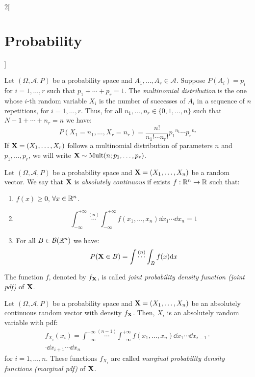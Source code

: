 \documentclass[../../../main.tex]{subfiles}
\begin{document}
\begin{multicols}{2}[\section{Probability}]
  \begin{definition}
    Let $(\Omega,\mathcal{A},P)$ be a probability space and $A_1,\ldots,A_r\in\mathcal{A}$. Suppose $P(A_i)=p_i$ for $i=1,\ldots,r$ such that $p_1+\cdots+p_r=1$. The \textit{multinomial distribution} is the one whose $i$-th random variable $X_i$ is the number of successes of $A_i$ in a sequence of $n$ repetitions, for $i=1,\ldots,r$. Thus, for all $n_1,\ldots,n_r\in\{0,1,\ldots,n\}$ such that $N-1+\cdots+n_r=n$ we have: $$P(X_1=n_1,\ldots,X_r=n_r)=\frac{n!}{n_1!\cdots n_r!} {p_1}^{n_1}\cdots{p_r}^{n_r}$$ If $\boldsymbol{\mathrm{X}}=(X_1,\ldots,X_r)$ follows a multinomial distribution of parameters $n$ and $p_1,\ldots,p_r$, we will write $\boldsymbol{\mathrm{X}}\sim \text{Mult}(n;p_1,\ldots,p_r)$.
  \end{definition}
  \begin{definition}
    Let $(\Omega,\mathcal{A},P)$ be a probability space and $\boldsymbol{\mathrm{X}}=(X_1,\ldots,X_n)$ be a random vector. We say that $\boldsymbol{\mathrm{X}}$ is \textit{absolutely continuous} if exists $f:\mathbb{R}^n\rightarrow\mathbb{R}$ such that:
    \begin{enumerate}
      \item $f(x)\geq 0$, $\forall x\in\mathbb{R}^n$.
      \item \hfill $$\int_{-\infty}^{+\infty}\overset{(n)}{\cdots}\int_{-\infty}^{+\infty} f(x_1,\ldots,x_n)\dd x_1\cdots\dd x_n=1$$
      \item For all $B\in\mathcal{B}(\mathbb{R}^n)$ we have: $$P(\boldsymbol{\mathrm{X}}\in B)=\int\overset{(n)}{\cdots}\int_Bf(x)\dd x$$
    \end{enumerate}
    The function $f$, denoted by $f_{\boldsymbol{\mathrm{X}}}$, is called \textit{joint probability density function (joint pdf)} of $\boldsymbol{\mathrm{X}}$.
  \end{definition}
  \begin{prop}
    Let $(\Omega,\mathcal{A},P)$ be a probability space and $\boldsymbol{\mathrm{X}}=(X_1,\ldots,X_n)$ be an absolutely continuous random vector with density $f_{\boldsymbol{\mathrm{X}}}$. Then, $X_i$ is an absolutely random variable with pdf:
    \begin{multline*}
      f_{X_i}(x_i)=\int_{-\infty}^{+\infty}\overset{(n-1)}{\cdots}\int_{-\infty}^{+\infty} f(x_1,\ldots,x_n)\dd x_1\cdots\dd x_{i-1}\cdot\\\cdot\dd x_{i+1}\cdots\dd x_n
    \end{multline*}
    for $i=1,\ldots, n$. These functions $f_{X_i}$ are called \textit{marginal probability density functions (marginal pdf)} of $\boldsymbol{\mathrm{X}}$.

\end{prop}
\end{multicols}
\end{document}
